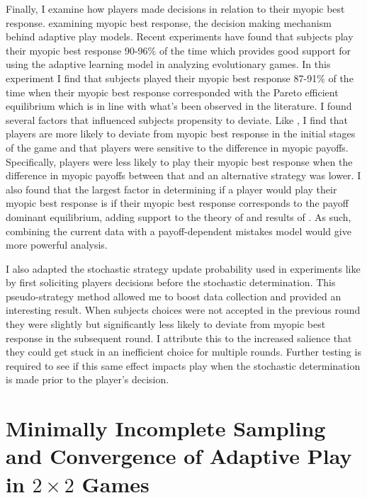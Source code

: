Finally, I examine how players made decisions in relation to their myopic best response.  examining myopic best response, the decision making mechanism behind adaptive play models. Recent experiments have found that subjects play their myopic best response 90-96\% of the time which provides good support for using the adaptive learning model in analyzing evolutionary games. In this experiment I find that subjects played their myopic best response 87-91\% of the time when their myopic best response corresponded with the Pareto efficient equilibrium which is in line with what's been observed in the literature.
I found several factors that influenced subjects propensity to deviate. Like \cite{lim2016experimental}, I find that players are more likely to deviate from myopic best response in the initial stages of the game and that players were sensitive to the difference in myopic payoffs. Specifically, players were less likely to play their myopic best response when the difference in myopic payoffs between that and an alternative strategy was lower. I also found that the largest factor in determining if a player would play their myopic best response is if their myopic best response corresponds to the payoff dominant equilibrium, adding support to the theory of \cite{harsanyi1988general} and results of \cite{jagau2022}. As such, combining the current data with a payoff-dependent mistakes model would give more powerful analysis.

I also adapted the stochastic strategy update probability used in experiments like \cite{hwang2018conventional} by first soliciting players decisions before the stochastic determination. This pseudo-strategy method allowed me to boost data collection and provided an interesting result. When subjects choices were not accepted in the previous round they were slightly but significantly less likely to deviate from myopic best response in the subsequent round. I attribute this to the increased salience that they could get stuck in an inefficient choice for multiple rounds. Further testing is required to see if this same effect impacts play when the stochastic determination is made prior to the player's decision. 


\chapter{Minimally Incomplete Sampling and Convergence of Adaptive Play in $2\times 2$ Games}

